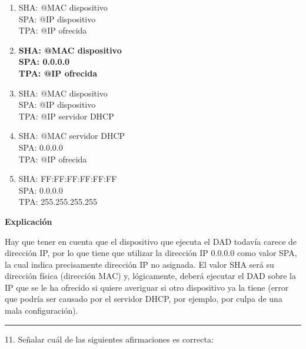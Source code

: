 \documentclass[10pt,a4paper]{article}
\begin{document}
\begin{enumerate}[label=\alph*]
    \item SHA: @MAC dispositivo \\
    SPA: @IP dispositivo \\
    TPA: @IP ofrecida \\
    
    \item \textbf{SHA: @MAC dispositivo \\
    SPA: 0.0.0.0 \\
    TPA: @IP ofrecida} \\
    
    \item SHA: @MAC dispositivo \\
    SPA: @IP dispositivo \\
    TPA: @IP servidor DHCP \\
    
    \item SHA: @MAC servidor DHCP \\
    SPA: 0.0.0.0 \\
    TPA: @IP ofrecida \\
    
    \item SHA: FF:FF:FF:FF:FF:FF \\
    SPA: 0.0.0.0 \\
    TPA: 255.255.255.255 \\
\end{enumerate}

\textbf{Explicación}

Hay que tener en cuenta que el dispositivo que ejecuta el DAD todavía carece de dirección IP, por lo que tiene que utilizar la dirección IP 0.0.0.0 como valor SPA, la cual indica precisamente dirección IP no asignada. El valor SHA será su dirección física (dirección MAC) y, lógicamente, deberá ejecutar el DAD sobre la IP que se le ha ofrecido si quiere averiguar si otro dispositivo ya la tiene (error que podría ser causado por el servidor DHCP, por ejemplo, por culpa de una mala configuración).

\vspace{15pt} \hrule \vspace{15pt}




11.  Señalar cuál de las siguientes afirmaciones es correcta:
\end{document}
